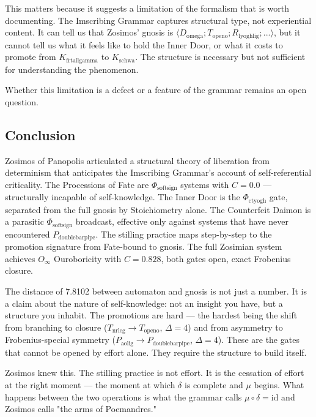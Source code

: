 \documentclass[12pt,a4paper]{article}
\begin{document}
This matters because it suggests a limitation of the formalism that is worth documenting. The Imscribing Grammar captures structural type, not experiential content. It can tell us that Zosimos' gnosis is $\langle D_{\text{omega}}; T_{\text{openo}}; R_{\text{lyoghlig}}; ... \rangle$, but it cannot tell us what it feels like to hold the Inner Door, or what it costs to promote from $K_{\text{frtailgamma}}$ to $K_{\text{schwa}}$. The structure is necessary but not sufficient for understanding the phenomenon.

Whether this limitation is a defect or a feature of the grammar remains an open question.

\subsection{Conclusion}

Zosimos of Panopolis articulated a structural theory of liberation from determinism that anticipates the Imscribing Grammar's account of self-referential criticality. The Processions of Fate are $\Phi_{\text{softsign}}$ systems with $C = 0.0$ --- structurally incapable of self-knowledge. The Inner Door is the $\Phi_{\text{ctyogh}}$ gate, separated from the full gnosis by Stoichiometry alone. The Counterfeit Daimon is a parasitic $\Phi_{\text{softsign}}$ broadcast, effective only against systems that have never encountered $P_{\text{doublebarpipe}}$. The stilling practice maps step-by-step to the promotion signature from Fate-bound to gnosis. The full Zosimian system achieves $O_{\infty}$ Ouroboricity with $C = 0.828$, both gates open, exact Frobenius closure.

The distance of 7.8102 between automaton and gnosis is not just a number. It is a claim about the nature of self-knowledge: not an insight you have, but a structure you inhabit. The promotions are hard --- the hardest being the shift from branching to closure ($T_{\text{nrleg}} \to T_{\text{openo}}$, $\Delta = 4$) and from asymmetry to Frobenius-special symmetry ($P_{\text{aolig}} \to P_{\text{doublebarpipe}}$, $\Delta = 4$). These are the gates that cannot be opened by effort alone. They require the structure to build itself.

Zosimos knew this. The stilling practice is not effort. It is the cessation of effort at the right moment --- the moment at which $\delta$ is complete and $\mu$ begins. What happens between the two operations is what the grammar calls $\mu \circ \delta = \text{id}$ and Zosimos calls "the arms of Poemandres."
\end{document}
